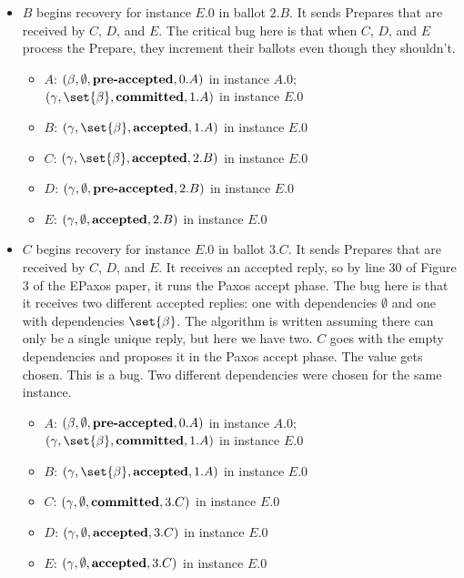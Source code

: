 \documentclass{mwhittaker}
\begin{document}
\begin{itemize}
  \item
    $B$ begins recovery for instance $E.0$ in ballot $2.B$. It sends Prepares
    that are received by $C$, $D$, and $E$. The critical bug here is that when
    $C$, $D$, and $E$ process the Prepare, they increment their ballots even
    though they shouldn't.
    \begin{itemize}
      \item $A$: $(\beta, \emptyset{}, \textbf{pre-accepted}{}, 0.A)$ in instance $A.0$;
                 $(\gamma, \set{\beta}, \committed{}, 1.A)$ in instance $E.0$
      \item $B$: $(\gamma, \set{\beta}, \accepted{}, 1.A)$ in instance $E.0$
      \item $C$: $(\gamma, \set{\beta}, \accepted{}, 2.B)$ in instance $E.0$
      \item $D$: $(\gamma, \emptyset{}, \textbf{pre-accepted}{}, 2.B)$ in instance $E.0$
      \item $E$: $(\gamma, \emptyset{}, \textbf{accepted}{}, 2.B)$ in instance $E.0$
    \end{itemize}

  \item
    $C$ begins recovery for instance $E.0$ in ballot $3.C$. It sends Prepares
    that are received by $C$, $D$, and $E$. It receives an accepted reply, so
    by line 30 of Figure 3 of the EPaxos paper, it runs the Paxos accept phase.
    The bug here is that it receives two different accepted replies: one with
    dependencies $\emptyset$ and one with dependencies $\set{\beta}$. The
    algorithm is written assuming there can only be a single unique reply, but
    here we have two. $C$ goes with the empty dependencies and proposes it in
    the Paxos accept phase. The value gets chosen. This is a bug. Two different
    dependencies were chosen for the same instance.
    \begin{itemize}
      \item $A$: $(\beta, \emptyset{}, \textbf{pre-accepted}{}, 0.A)$ in instance $A.0$;
                 $(\gamma, \set{\beta}, \committed{}, 1.A)$ in instance $E.0$
      \item $B$: $(\gamma, \set{\beta}, \accepted{}, 1.A)$ in instance $E.0$
      \item $C$: $(\gamma, \emptyset{}, \textbf{committed}{}, 3.C)$ in instance $E.0$
      \item $D$: $(\gamma, \emptyset{}, \textbf{accepted}{}, 3.C)$ in instance $E.0$
      \item $E$: $(\gamma, \emptyset{}, \textbf{accepted}{}, 3.C)$ in instance $E.0$
    \end{itemize}

\end{itemize}



\end{document}
